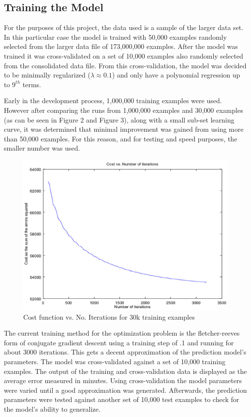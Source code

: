 \documentclass{sig-alternate}
\begin{document}
\subsection{Training the Model}

For the purposes of this project, the data used is a sample of the larger data set. In this particular case the model is trained with 50,000 examples randomly selected from the larger data file of 173,000,000 examples. After the model was trained it was cross-validated on a set of 10,000 examples also randomly selected from the consolidated data file. From this cross-validation, the model was decided to be minimally regularized ($\lambda \approx 0.1$) and only have a polynomial regression up to $9^{th}$ terms.

Early in the development process, 1,000,000 training examples were used. However after comparing the runs from 1,000,000 examples and 30,000 examples (as can be seen in Figure 2 and Figure 3), along with a small sub-set learning curve, it was determined that minimal improvement was gained from using more than 50,000 examples. For this reason, and for testing and speed purposes, the smaller number was used.

\begin{figure}
\centering
\includegraphics[scale=0.35]{Cost_Function_Graph_30k.eps}
\caption{Cost function vs. No. Iterations for 30k training examples}
\end{figure}
	
The current training method for the optimization problem is the fletcher-reeves form of conjugate gradient descent using a training step of .1 and running for about 3000 iterations. This gets a decent approximation of the prediction model's parameters. The model was cross-validated against a set of 10,000 training examples. The output of the training and cross-validation data is displayed as the average error measured in minutes. Using cross-validation the model parameters were varied until a good approximation was generated. Afterwards, the prediction parameters were tested against another set of 10,000 test examples to check for the model's ability to generalize. 
\end{document}
